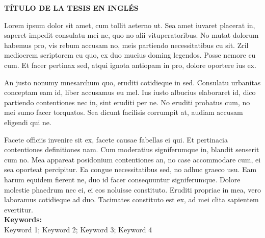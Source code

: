\documentclass[../main.tex]{subfiles}
\begin{document}

\begin{center}
\large \vspace{-1.5cm} \textbf{TÍTULO DE LA TESIS EN INGLÉS}
\end{center}

Lorem ipsum dolor sit amet, cum tollit aeterno ut. Sea amet iuvaret placerat in, saperet impedit consulatu mei ne, quo no alii vituperatoribus. No mutat dolorum habemus pro, vis rebum accusam no, meis partiendo necessitatibus cu sit. Zril mediocrem scriptorem cu quo, ex duo mucius doming legendos. Posse nemore cu cum. Et facer pertinax sed, atqui ignota antiopam in pro, dolore oportere ius ex.

An justo nonumy mnesarchum quo, eruditi cotidieque in sed. Consulatu urbanitas conceptam eam id, liber accusamus eu mel. Ius iusto albucius elaboraret id, dico partiendo contentiones nec in, sint eruditi per ne. No eruditi probatus cum, no mei sumo facer torquatos. Sea dicunt facilisis corrumpit at, audiam accusam eligendi qui ne.

Facete officiis invenire sit ex, facete causae fabellas ei qui. Et pertinacia contentiones definitiones nam. Cum moderatius signiferumque in, blandit senserit cum no. Mea appareat posidonium contentiones an, no case accommodare cum, ei sea oporteat percipitur. 
Ea congue necessitatibus sed, no adhuc graeco usu. Eam harum equidem fierent ne, duo id facer consequuntur signiferumque. 
Dolore molestie phaedrum nec ei, ei eos noluisse constituto. Eruditi propriae in mea, vero laboramus cotidieque ad duo. Tacimates constituto est ex, ad mei clita sapientem evertitur. \\


\noindent \textbf{Keywords:}\\
\noindent Keyword 1; Keyword 2; Keyword 3; Keyword 4
\end{document}
